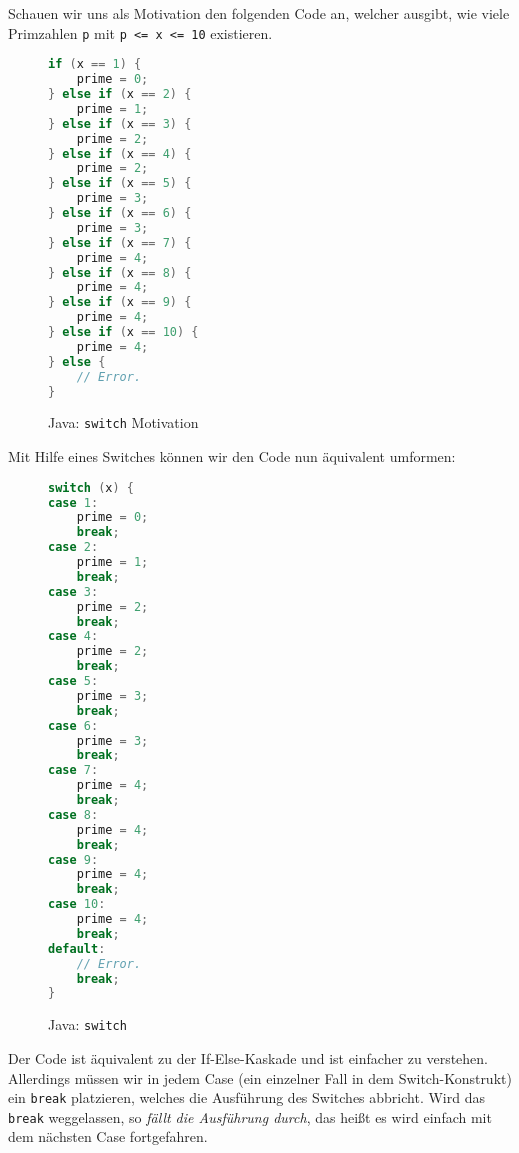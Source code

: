 		Schauen wir uns als Motivation den folgenden Code an, welcher ausgibt, wie viele Primzahlen \texttt{p} mit \texttt{p <= x <= 10} existieren.
		\begin{figure}[H]
			\centering
			\begin{lstlisting}[language = Java]
if (x == 1) {
	prime = 0;
} else if (x == 2) {
	prime = 1;
} else if (x == 3) {
	prime = 2;
} else if (x == 4) {
	prime = 2;
} else if (x == 5) {
	prime = 3;
} else if (x == 6) {
	prime = 3;
} else if (x == 7) {
	prime = 4;
} else if (x == 8) {
	prime = 4;
} else if (x == 9) {
	prime = 4;
} else if (x == 10) {
	prime = 4;
} else {
	// Error.
}
			\end{lstlisting}
			\caption{Java: \texttt{switch} Motivation}
		\end{figure}
		
		Mit Hilfe eines Switches können wir den Code nun äquivalent umformen:
		\begin{figure}[H]
			\centering
			\begin{lstlisting}[language = Java]
switch (x) {
case 1:
	prime = 0;
	break;
case 2:
	prime = 1;
	break;
case 3:
	prime = 2;
	break;
case 4:
	prime = 2;
	break;
case 5:
	prime = 3;
	break;
case 6:
	prime = 3;
	break;
case 7:
	prime = 4;
	break;
case 8:
	prime = 4;
	break;
case 9:
	prime = 4;
	break;
case 10:
	prime = 4;
	break;
default:
	// Error.
	break;
}
			\end{lstlisting}
			\caption{Java: \texttt{switch}}
		\end{figure}
		
		Der Code ist äquivalent zu der If-Else-Kaskade und ist einfacher zu verstehen. Allerdings müssen wir in jedem Case (ein einzelner Fall in dem Switch-Konstrukt) ein \texttt{break} platzieren, welches die Ausführung des Switches abbricht. Wird das \texttt{break} weggelassen, so \textit{fällt die Ausführung durch}, das heißt es wird einfach mit dem nächsten Case fortgefahren.
		
